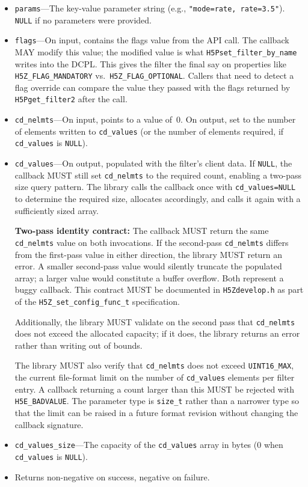 \documentclass[../HDF5_RFC.tex]{subfiles}
\begin{document}

\begin{itemize}
\item \texttt{params}---The key-value parameter string (e.g.,
  \texttt{"mode=rate, rate=3.5"}). \texttt{NULL} if no parameters were provided.
\item \texttt{flags}---On input, contains the flags value from the API call. The
  callback MAY modify this value; the modified value is what
  \texttt{H5Pset\_filter\_by\_name} writes into the DCPL. This gives the filter the
  final say on properties like \texttt{H5Z\_FLAG\_MANDATORY} vs.\
  \texttt{H5Z\_FLAG\_OPTIONAL}. Callers that need to detect a flag override can
  compare the value they passed with the flags returned by
  \texttt{H5Pget\_filter2} after the call.
\item \texttt{cd\_nelmts}---On input, points to a value of~0. On output, set to the
  number of elements written to \texttt{cd\_values} (or the number of elements
  required, if \texttt{cd\_values} is \texttt{NULL}).
\item \texttt{cd\_values}---On output, populated with the filter's client data. If
  \texttt{NULL}, the callback MUST still set \texttt{cd\_nelmts} to the required count,
  enabling a two-pass size query pattern. The library calls the callback once
  with \texttt{cd\_values=NULL} to determine the required size, allocates
  accordingly, and calls it again with a sufficiently sized array.

  \textbf{Two-pass identity contract:} The callback MUST return the same
  \texttt{cd\_nelmts} value on both invocations. If the second-pass \texttt{cd\_nelmts}
  differs from the first-pass value in either direction, the library MUST
  return an error. A smaller second-pass value would silently truncate the
  populated array; a larger value would constitute a buffer overflow. Both
  represent a buggy callback. This contract MUST be documented in
  \texttt{H5Zdevelop.h} as part of the \texttt{H5Z\_set\_config\_func\_t} specification.

  Additionally, the library MUST validate on the second pass that
  \texttt{cd\_nelmts} does not exceed the allocated capacity; if it does, the
  library returns an error rather than writing out of bounds.

  The library MUST also verify that \texttt{cd\_nelmts} does not exceed
  \texttt{UINT16\_MAX}, the current file-format limit on the number of
  \texttt{cd\_values} elements per filter entry.  A callback returning a count
  larger than this MUST be rejected with \texttt{H5E\_BADVALUE}.  The parameter
  type is \texttt{size\_t} rather than a narrower type so that the limit can be
  raised in a future format revision without changing the callback signature.
\item \texttt{cd\_values\_size}---The capacity of the \texttt{cd\_values} array in
  bytes (0 when \texttt{cd\_values} is \texttt{NULL}).
\item Returns non-negative on success, negative on failure.
\end{itemize}
\end{document}
